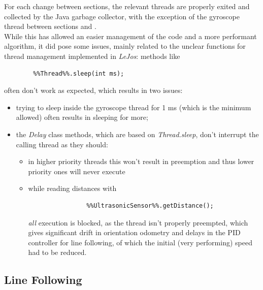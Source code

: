 \documentclass[a4paper,11pt,oneside]{book}
\newcommand{\RNum}[1]{\uppercase\expandafter{\romannumeral #1\relax}}
\begin{document}
		For each change between sections, the relevant threads are properly exited and collected by the Java garbage collector, with the exception of the gyroscope thread between sections \RNum{2} and \RNum{3}.\\
		
		While this has allowed an easier management of the code and a more performant algorithm, it did pose some issues, mainly related to the unclear functions for thread management implemented in \textit{LeJos}: methods like
		\begin{lstlisting}
		%%Thread%%.sleep(int ms);
		\end{lstlisting}
		often don't work as expected, which results in two issues:
		\begin{itemize}
			\item trying to sleep inside the gyroscope thread for 1 ms (which is the minimum allowed) often results in sleeping for more;
			\item the \textit{Delay} class methods, which are based on \textit{Thread.sleep}, don't interrupt the calling thread as they should:
				\begin{itemize}
				\item in higher priority threads this won't result in preemption and thus lower priority ones will never execute
				\item while reading distances with 
				\begin{lstlisting}
				%%UltrasonicSensor%%.getDistance();
				\end{lstlisting}
				\emph{all} execution is blocked, as the thread isn't properly preempted, which gives significant drift in orientation odometry and delays in the PID controller for line following, of which the initial (very performing) speed had to be reduced.
			\end{itemize}
				
		
		\end{itemize}
		
		
		\subsection {Line Following}
		
\end{document}
